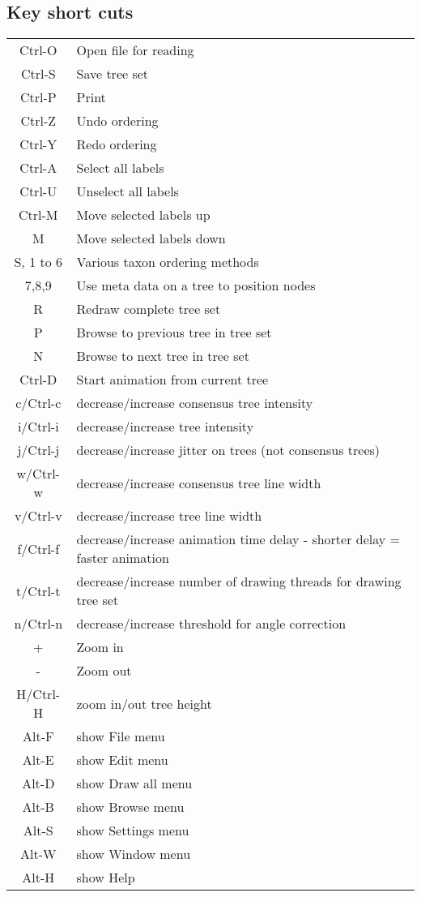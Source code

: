 \documentclass{article}
\begin{document}
\subsection{Key short cuts}
\begin{center}
\begin{tabular}{|c|l|}
\hline
Ctrl-O & Open file for reading \\
Ctrl-S & Save tree set\\
Ctrl-P & Print \\
\hline
Ctrl-Z & Undo ordering \\
Ctrl-Y & Redo ordering \\
Ctrl-A & Select all labels \\
Ctrl-U & Unselect all labels \\
Ctrl-M & Move selected labels up \\
M & Move selected labels down \\
\hline 
S, 1 to 6 & Various taxon ordering methods \\
7,8,9 & Use meta data on a tree to position nodes\\
\hline
R & Redraw complete tree set \\
\hline
P & Browse to previous tree in tree set \\
N & Browse to next tree in tree set\\
Ctrl-D & Start animation from current tree\\
\hline
c/Ctrl-c &decrease/increase consensus tree intensity\\
i/Ctrl-i &decrease/increase tree intensity\\
j/Ctrl-j &decrease/increase jitter on trees (not consensus trees)\\
w/Ctrl-w &decrease/increase consensus tree line width\\
v/Ctrl-v &decrease/increase tree line width\\
f/Ctrl-f &decrease/increase animation time delay - shorter delay = faster animation\\
t/Ctrl-t &decrease/increase number of drawing threads for drawing tree set\\
n/Ctrl-n &decrease/increase threshold for angle correction\\
\hline
+ & Zoom in \\
- & Zoom out \\
H/Ctrl-H &zoom in/out tree height\\
\hline
Alt-F & show File menu\\
Alt-E & show Edit menu\\
Alt-D & show Draw all menu\\
Alt-B & show Browse menu\\
Alt-S & show Settings menu\\
Alt-W & show Window menu\\
Alt-H & show Help\\
\hline
\end{tabular}
\end{center}
\fi
\end{document}
